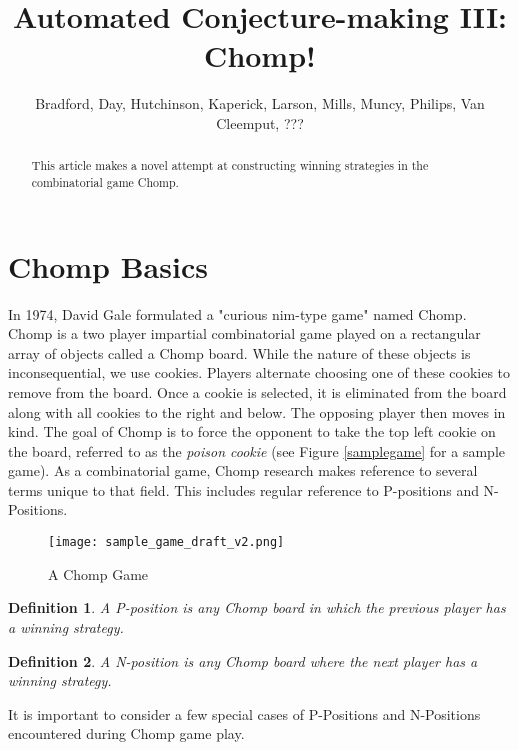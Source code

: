 \documentclass{amsart}
\title{Automated Conjecture-making III: Chomp!}
\author{Bradford, Day, Hutchinson, Kaperick, Larson, Mills, Muncy, Philips, Van Cleemput, ???}
\newtheorem{term}{Definition} %
\theoremstyle{definition}
\theoremstyle{remark}
\numberwithin{equation}{section}
\begin{document}
\begin{abstract}
This article makes a novel attempt at constructing winning strategies in the combinatorial game Chomp. 
\end{abstract}
\maketitle


\section{Chomp Basics}
\noindent In 1974, David Gale formulated a "curious nim-type game" named Chomp\cite{Gale74}. Chomp is a two player impartial combinatorial game played on a rectangular array of objects called a Chomp board. While the nature of these objects is inconsequential, we use cookies. Players alternate choosing one of these cookies to remove from the board.  Once a cookie is selected, it is eliminated from the board along with all cookies to the right and below. The opposing player then moves in kind.  The goal of Chomp is to force the opponent to take the top left cookie on the board, referred to as the \textit{poison cookie} (see Figure \ref{samplegame} for a sample game). As a combinatorial game, Chomp research makes reference to several terms unique to that field. This includes regular reference to P-positions and N-Positions\cite{winningways}.\\

\begin{figure}[samplegame]
\texttt{[image: sample\_game\_draft\_v2.png]}
\caption{A Chomp Game}
\end{figure}

\begin{term}
 A \textit{P-position} is any Chomp board in which the previous player has a winning strategy.
\end{term}

\begin{term} A \textit{N-position} is any Chomp board where the next player has a winning strategy.\\
\end{term}

\noindent It is important to consider a few special cases of P-Positions and N-Positions encountered during Chomp game play. \\
\end{document}
